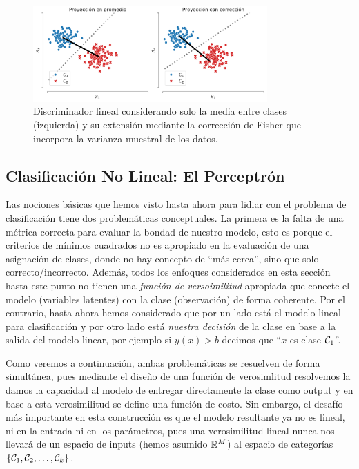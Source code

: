 \begin{figure}[H]
	\centering
	\includegraphics[width=0.8\textwidth]{img/cap2_dos_clases_proyeccion.pdf}
	\caption{Discriminador lineal considerando solo la media entre clases (izquierda) y  su extensión mediante la corrección de Fisher que incorpora la varianza muestral de los datos.}
	\label{fig:ej_fda}
\end{figure}


\subsection{Clasificación No Lineal: El Perceptrón}

Las nociones básicas que hemos visto hasta ahora para lidiar con el problema de clasificación tiene dos problemáticas conceptuales. La primera es la falta de una métrica correcta para evaluar la bondad de nuestro modelo,  esto es porque el criterios de mínimos cuadrados no es apropiado en la evaluación de una asignación de clases, donde no hay concepto de ``más cerca'', sino que solo correcto/incorrecto. Además, todos los enfoques considerados en esta sección hasta este punto no tienen una \emph{función de versoimilitud} apropiada que conecte el modelo (variables latentes) con la clase  (observación) de forma coherente. Por el contrario, hasta ahora hemos considerado que  por un lado está el modelo lineal para clasificación y por otro lado está \emph{nuestra decisión} de la clase en base a la salida del modelo linear, por  ejemplo si $y(x)>b$ decimos que ``$x$ es clase ${\mathcal C}_1$''.

Como veremos a continuación, ambas problemáticas se resuelven de forma simultánea, pues mediante el diseño de una función de verosimlitud resolvemos la damos la capacidad al modelo de entregar directamente la clase como  output y en base a esta  verosimilitud se define  una función de costo. Sin embargo, el desafío más importante en esta construcción es que el modelo resultante ya no es lineal, ni en la entrada ni en los parámetros, pues una verosimilitud lineal nunca nos  llevará de un espacio de inputs (hemos asumido ${\mathbb R}^M$) al espacio de categorías $\{{\mathcal C}_1,{\mathcal C}_2,\ldots,{\mathcal C}_k\}$.

